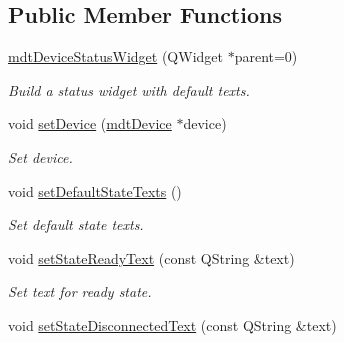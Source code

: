 \subsection*{Public Member Functions}
\begin{DoxyCompactItemize}
\item 
\hypertarget{classmdt_device_status_widget_ad1dd6b00c3ef394b4dc2bea36bcd4462}{
\hyperlink{classmdt_device_status_widget_ad1dd6b00c3ef394b4dc2bea36bcd4462}{mdtDeviceStatusWidget} (QWidget $\ast$parent=0)}
\label{classmdt_device_status_widget_ad1dd6b00c3ef394b4dc2bea36bcd4462}

\begin{DoxyCompactList}\small\item\em Build a status widget with default texts. \end{DoxyCompactList}\item 
void \hyperlink{classmdt_device_status_widget_ac7b010932ee6c83ffc9efe006ee13f22}{setDevice} (\hyperlink{classmdt_device}{mdtDevice} $\ast$device)
\begin{DoxyCompactList}\small\item\em Set device. \end{DoxyCompactList}\item 
\hypertarget{classmdt_device_status_widget_aaaac01ef5272b66bc0a3daf19e20047c}{
void \hyperlink{classmdt_device_status_widget_aaaac01ef5272b66bc0a3daf19e20047c}{setDefaultStateTexts} ()}
\label{classmdt_device_status_widget_aaaac01ef5272b66bc0a3daf19e20047c}

\begin{DoxyCompactList}\small\item\em Set default state texts. \end{DoxyCompactList}\item 
\hypertarget{classmdt_device_status_widget_abaf710ee64a06fa9d3d640e785c38dd5}{
void \hyperlink{classmdt_device_status_widget_abaf710ee64a06fa9d3d640e785c38dd5}{setStateReadyText} (const QString \&text)}
\label{classmdt_device_status_widget_abaf710ee64a06fa9d3d640e785c38dd5}

\begin{DoxyCompactList}\small\item\em Set text for ready state. \end{DoxyCompactList}\item 
\hypertarget{classmdt_device_status_widget_a9c296a28b7de3cf9694a0630a64bee15}{
void \hyperlink{classmdt_device_status_widget_a9c296a28b7de3cf9694a0630a64bee15}{setStateDisconnectedText} (const QString \&text)}
\label{classmdt_device_status_widget_a9c296a28b7de3cf9694a0630a64bee15}


\end{DoxyCompactItemize}
